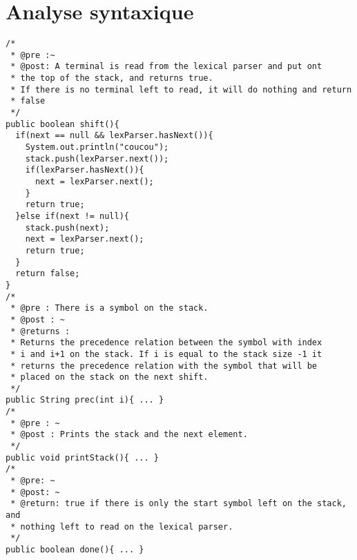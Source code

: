 \section{Analyse syntaxique}
	

\begin{verbatim}
/*
 * @pre :~
 * @post: A terminal is read from the lexical parser and put ont
 * the top of the stack, and returns true.
 * If there is no terminal left to read, it will do nothing and return 
 * false
 */
public boolean shift(){
  if(next == null && lexParser.hasNext()){
    System.out.println("coucou");
    stack.push(lexParser.next());
    if(lexParser.hasNext()){
      next = lexParser.next();
    }
    return true;
  }else if(next != null){
    stack.push(next);
    next = lexParser.next();
    return true;
  }
  return false;
}
/*
 * @pre : There is a symbol on the stack.
 * @post : ~
 * @returns : 
 * Returns the precedence relation between the symbol with index
 * i and i+1 on the stack. If i is equal to the stack size -1 it
 * returns the precedence relation with the symbol that will be
 * placed on the stack on the next shift.
 */
public String prec(int i){ ... }
/*
 * @pre : ~
 * @post : Prints the stack and the next element. 
 */
public void printStack(){ ... }
/* 
 * @pre: ~
 * @post: ~
 * @return: true if there is only the start symbol left on the stack, and 
 * nothing left to read on the lexical parser.
 */
public boolean done(){ ... }


\end{verbatim}
